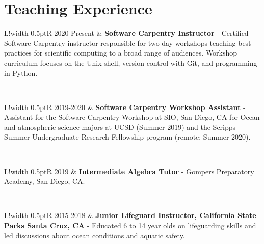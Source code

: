 \documentclass[10pt]{article}
\newcommand\VRule{\color{lightgray}\vrule width 0.5pt}
\begin{document}
\section*{Teaching Experience}
\vspace{.3cm}
\begin{tabular}{L!{\VRule}R}
2020-Present & \textbf{Software Carpentry Instructor} - Certified Software Carpentry instructor responsible for two day workshops teaching best practices for scientific computing to a broad range of audiences. Workshop curriculum focuses on the Unix shell, version control with Git, and programming in Python.  \\[5pt]
\end{tabular}
\\[10pt]
\begin{tabular}{L!{\VRule}R}
2019-2020 & \textbf{Software Carpentry Workshop Assistant} - Assistant for the Software Carpentry Workshop at SIO, San Diego, CA for Ocean and atmospheric science majors at UCSD (Summer 2019) and the Scripps Summer Undergraduate Research Fellowship program (remote; Summer 2020). \\[5pt]
\end{tabular}
\\[10pt]
\begin{tabular}{L!{\VRule}R}
2019 & \textbf{Intermediate Algebra Tutor} - Gompers Preparatory Academy, San Diego, CA. \\[5pt]
\end{tabular}
\\[10pt]
\begin{tabular}{L!{\VRule}R}
2015-2018 & \textbf{Junior Lifeguard Instructor, California State Parks Santa Cruz, CA } - Educated 6 to 14 year olds on lifeguarding skills and led discussions about ocean conditions and aquatic safety. \\[5pt]
\end{tabular}

\end{document}

